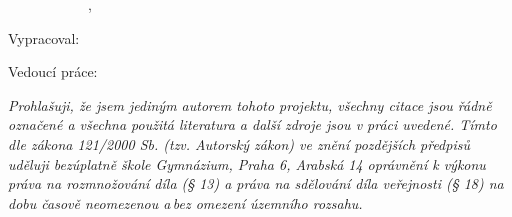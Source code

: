 \pagestyle{empty}
\hypersetup{pageanchor=false}

\begin{center}
	\begin{figure}[h!]
		\begin{center}
			\begin{subfigure}[b]{0.1\linewidth}
				\def\svgwidth{\columnwidth}\scalebox{1}{}
			\end{subfigure}
			\begin{subfigure}[b]{0.8\linewidth}
				{\LARGE\bfseries\NazevSkoly}

				\vspace{3mm}

				{\LARGE\TypPrace, \NazevOboru}
				\vspace{-1mm}
			\end{subfigure}
		\end{center}
	\end{figure}

	\vfill

	\def\svgwidth{\columnwidth}\scalebox{0.3}{}

	\vfill

	{\bf\Huge\NazevPraceShort}

	\vspace{3.5mm}
	{\bf\Large\NazevPrace}

	\vfill
	\vfill

	Vypracoval: \hfill \AutorPrace

	Vedoucí práce: \hfill \VedouciPrace

	\vspace{5mm}
	\DatumOdevzdani
\end{center}

\newpage
\hypersetup{pageanchor=true}
\pagestyle{plain}

\openright

\vspace*{\fill}

\noindent
\textit{
	Prohlašuji, že jsem jediným autorem tohoto projektu, všechny citace jsou řádně označené
	a všechna použitá literatura a další zdroje jsou v práci uvedené. Tímto dle zákona
	121/2000 Sb. (tzv. Autorský zákon) ve znění pozdějších předpisů uděluji bezúplatně škole
	Gymnázium, Praha 6, Arabská 14 oprávnění k výkonu práva na rozmnožování díla (§ 13) a
	práva na sdělování díla veřejnosti (§ 18) na dobu časově neomezenou a\,bez omezení
	územního rozsahu.
}

